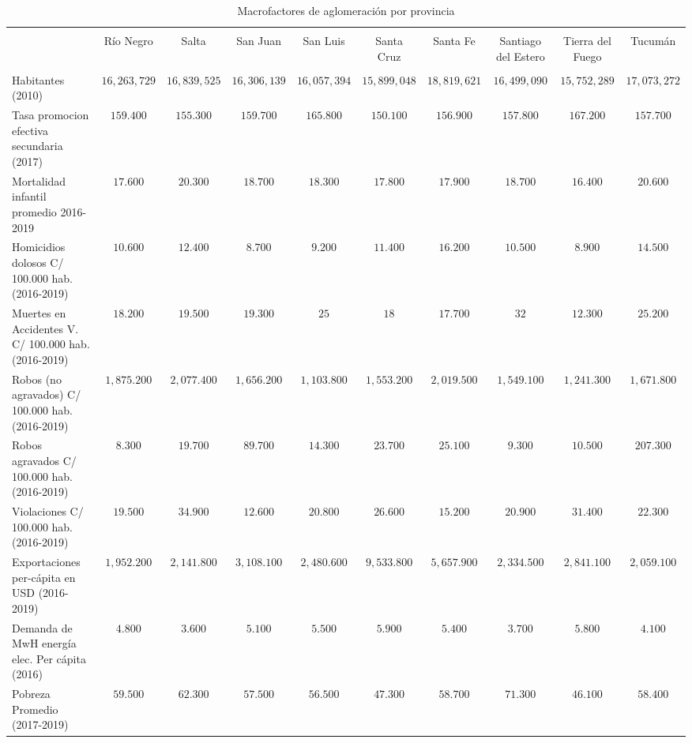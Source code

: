 \documentclass[12pt,a4paper]{article}
\begin{document}
\begin{table} \centering \tiny
 \centering 
  \caption{Macrofactores de aglomeración por provincia} 
  \label{} 
\begin{tabular}{@{\extracolsep{5pt}} lccccccccc} 
\\[-1.8ex]\hline 
\hline \\[-1.8ex] 
 & Río Negro & Salta & San Juan & San Luis & Santa Cruz & Santa Fe & Santiago del Estero & Tierra del Fuego & Tucumán \\ 
\hline \\[-1.8ex] 
Habitantes (2010) & $16,263,729$ & $16,839,525$ & $16,306,139$ & $16,057,394$ & $15,899,048$ & $18,819,621$ & $16,499,090$ & $15,752,289$ & $17,073,272$ \\ 
Tasa promocion efectiva secundaria (2017) & $159.400$ & $155.300$ & $159.700$ & $165.800$ & $150.100$ & $156.900$ & $157.800$ & $167.200$ & $157.700$ \\ 
Mortalidad infantil promedio 2016-2019 & $17.600$ & $20.300$ & $18.700$ & $18.300$ & $17.800$ & $17.900$ & $18.700$ & $16.400$ & $20.600$ \\ 
Homicidios dolosos C/ 100.000 hab. (2016-2019) & $10.600$ & $12.400$ & $8.700$ & $9.200$ & $11.400$ & $16.200$ & $10.500$ & $8.900$ & $14.500$ \\ 
Muertes en Accidentes V. C/ 100.000  hab.  (2016-2019) & $18.200$ & $19.500$ & $19.300$ & $25$ & $18$ & $17.700$ & $32$ & $12.300$ & $25.200$ \\ 
Robos (no agravados) C/ 100.000 hab. (2016-2019) & $1,875.200$ & $2,077.400$ & $1,656.200$ & $1,103.800$ & $1,553.200$ & $2,019.500$ & $1,549.100$ & $1,241.300$ & $1,671.800$ \\ 
Robos agravados C/ 100.000 hab. (2016-2019) & $8.300$ & $19.700$ & $89.700$ & $14.300$ & $23.700$ & $25.100$ & $9.300$ & $10.500$ & $207.300$ \\ 
Violaciones  C/ 100.000 hab. (2016-2019) & $19.500$ & $34.900$ & $12.600$ & $20.800$ & $26.600$ & $15.200$ & $20.900$ & $31.400$ & $22.300$ \\ 
Exportaciones per-cápita en USD (2016-2019) & $1,952.200$ & $2,141.800$ & $3,108.100$ & $2,480.600$ & $9,533.800$ & $5,657.900$ & $2,334.500$ & $2,841.100$ & $2,059.100$ \\ 
Demanda de MwH energía elec. Per cápita (2016) & $4.800$ & $3.600$ & $5.100$ & $5.500$ & $5.900$ & $5.400$ & $3.700$ & $5.800$ & $4.100$ \\ 
Pobreza Promedio (2017-2019) & $59.500$ & $62.300$ & $57.500$ & $56.500$ & $47.300$ & $58.700$ & $71.300$ & $46.100$ & $58.400$ \\ 

\end{tabular}
\end{table}
\end{document}
